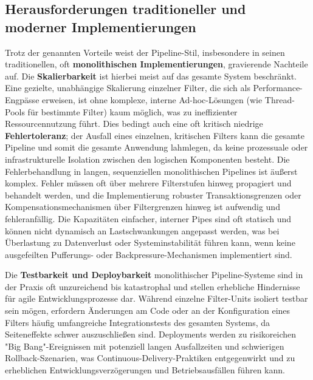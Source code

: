 \documentclass[10pt]{article}
\begin{document}
\begin{multicols}{2}
\subsection{Herausforderungen traditioneller und moderner Implementierungen}
Trotz der genannten Vorteile weist der Pipeline-Stil, insbesondere in seinen traditionellen, oft \textbf{monolithischen Implementierungen}, gravierende Nachteile auf. Die \textbf{Skalierbarkeit} ist hierbei meist auf das gesamte System beschränkt. Eine gezielte, unabhängige Skalierung einzelner Filter, die sich als Performance-Engpässe erweisen, ist ohne komplexe, interne Ad-hoc-Lösungen (wie Thread-Pools für bestimmte Filter) kaum möglich, was zu ineffizienter Ressourcennutzung führt.\cite{richards2020} Dies bedingt auch eine oft kritisch niedrige \textbf{Fehlertoleranz}; der Ausfall eines einzelnen, kritischen Filters kann die gesamte Pipeline und somit die gesamte Anwendung lahmlegen, da keine prozessuale oder infrastrukturelle Isolation zwischen den logischen Komponenten besteht.\cite{richards2020} Die Fehlerbehandlung in langen, sequenziellen monolithischen Pipelines ist äußerst komplex. Fehler müssen oft über mehrere Filterstufen hinweg propagiert und behandelt werden, und die Implementierung robuster Transaktionsgrenzen oder Kompensationsmechanismen über Filtergrenzen hinweg ist aufwendig und fehleranfällig. Die Kapazitäten einfacher, interner Pipes sind oft statisch und können nicht dynamisch an Lastschwankungen angepasst werden, was bei Überlastung zu Datenverlust oder Systeminstabilität führen kann, wenn keine ausgefeilten Pufferungs- oder Backpressure-Mechanismen implementiert sind.

Die \textbf{Testbarkeit und Deploybarkeit} monolithischer Pipeline-Systeme sind in der Praxis oft unzureichend bis katastrophal und stellen erhebliche Hindernisse für agile Entwicklungsprozesse dar. Während einzelne Filter-Units isoliert testbar sein mögen, erfordern Änderungen am Code oder an der Konfiguration eines Filters häufig umfangreiche Integrationstests des gesamten Systems, da Seiteneffekte schwer auszuschließen sind. Deployments werden zu risikoreichen "Big Bang"-Ereignissen mit potenziell langen Ausfallzeiten und schwierigen Rollback-Szenarien, was Continuous-Delivery-Praktiken entgegenwirkt und zu erheblichen Entwicklungsverzögerungen und Betriebsausfällen führen kann.\cite{richards2020}


\end{multicols}
\end{document}
